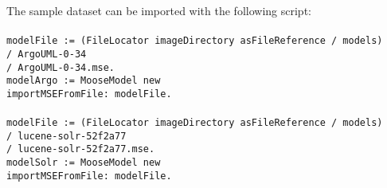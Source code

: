 \documentclass [11pt, a4wide, twoside]{article}
\begin{document}
\newpage

\noindent The sample dataset can be imported with the following script:\\\\
\texttt{modelFile := (FileLocator imageDirectory asFileReference / \textquotesingle models\textquotesingle)\\
\hspace*{0.5cm}/ \textquotesingle ArgoUML-0-34\textquotesingle\\
\hspace*{0.5cm}/ \textquotesingle ArgoUML-0-34.mse\textquotesingle.\\
modelArgo := MooseModel new\\
\hspace*{0.5cm}importMSEFromFile: modelFile.}\\\\
\texttt{modelFile := (FileLocator imageDirectory asFileReference / \textquotesingle models\textquotesingle)\\
\hspace*{0.5cm}/ \textquotesingle lucene-solr-52f2a77\textquotesingle\\
\hspace*{0.5cm}/ \textquotesingle lucene-solr-52f2a77.mse\textquotesingle.\\
modelSolr := MooseModel new\\
\hspace*{0.5cm}importMSEFromFile: modelFile.}\\\\\\

\end{document}
